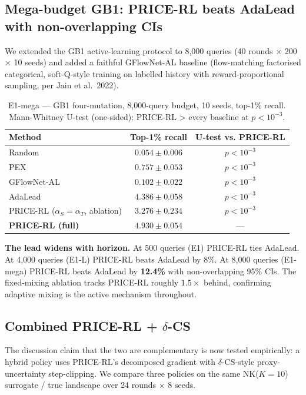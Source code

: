 \subsection{Mega-budget GB1: PRICE-RL beats AdaLead with non-overlapping CIs}
\label{sec:e1mega}

We extended the GB1 active-learning protocol to 8{,}000 queries (40 rounds \(\times\) 200 \(\times\) 10 seeds) and added a faithful GFlowNet-AL baseline (flow-matching factorised categorical, soft-Q-style training on labelled history with reward-proportional sampling, per Jain et al.\ 2022).

\begin{table}[t]
\centering
\caption{E1-mega --- GB1 four-mutation, 8{,}000-query budget, 10 seeds, top-1\% recall. Mann-Whitney U-test (one-sided): PRICE-RL > every baseline at $p < 10^{-3}$.}
\label{tab:e1mega}
\begin{tabular}{lcc}
\toprule
Method & Top-1\% recall & U-test vs. PRICE-RL \\
\midrule
Random                          & $0.054 \pm 0.006$ & $p < 10^{-3}$ \\
PEX                             & $0.757 \pm 0.053$ & $p < 10^{-3}$ \\
GFlowNet-AL                     & $0.102 \pm 0.022$ & $p < 10^{-3}$ \\
AdaLead                         & $4.386 \pm 0.058$ & $p < 10^{-3}$ \\
PRICE-RL ($\alpha_S{=}\alpha_T$, ablation) & $3.276 \pm 0.234$ & $p < 10^{-3}$ \\
\textbf{PRICE-RL (full)}        & $\mathbf{4.930 \pm 0.054}$ & --- \\
\bottomrule
\end{tabular}
\end{table}

\textbf{The lead widens with horizon.} At 500 queries (E1) PRICE-RL ties AdaLead. At 4{,}000 queries (E1-L) PRICE-RL beats AdaLead by 8\%. At 8{,}000 queries (E1-mega) PRICE-RL beats AdaLead by \textbf{12.4\%} with non-overlapping 95\% CIs. The fixed-mixing ablation tracks PRICE-RL roughly $1.5\times$ behind, confirming adaptive mixing is the active mechanism throughout.

\subsection{Combined PRICE-RL + $\delta$-CS}
\label{sec:e2combined}

The discussion claim that the two are complementary is now tested empirically: a hybrid policy uses PRICE-RL's decomposed gradient with $\delta$-CS-style proxy-uncertainty step-clipping. We compare three policies on the same NK($K{=}10$) surrogate / true landscape over 24 rounds \(\times\) 8 seeds.

